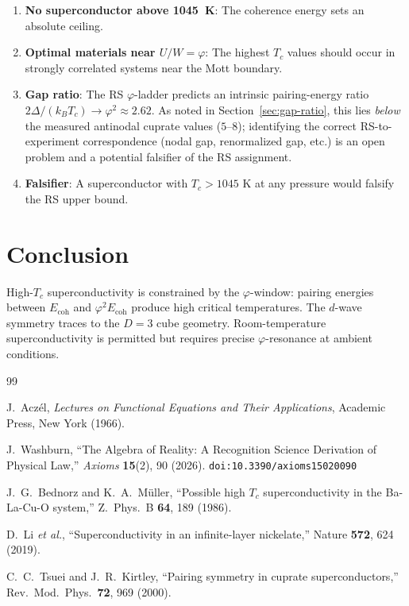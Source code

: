 \documentclass[12pt,a4paper]{article}
\theoremstyle{definition}
\theoremstyle{remark}
\begin{document}
\begin{enumerate}
  \item \textbf{No superconductor above 1045~K}: The coherence
  energy sets an absolute ceiling.

  \item \textbf{Optimal materials near $U/W = \varphi$}: The
  highest $T_c$ values should occur in strongly correlated
  systems near the Mott boundary.

  \item \textbf{Gap ratio}: The RS $\varphi$-ladder predicts an intrinsic
  pairing-energy ratio $2\Delta/(k_BT_c) \to \varphi^2 \approx 2.62$.
  As noted in Section~\ref{sec:gap-ratio}, this lies \emph{below} the
  measured antinodal cuprate values ($5$--$8$); identifying the correct
  RS-to-experiment correspondence (nodal gap, renormalized gap, etc.)
  is an open problem and a potential falsifier of the RS assignment.

  \item \textbf{Falsifier}: A superconductor with $T_c > 1045$ K
  at any pressure would falsify the RS upper bound.
\end{enumerate}

\section{Conclusion}
\label{sec:conclusion}

High-$T_c$ superconductivity is constrained by the $\varphi$-window:
pairing energies between $E_{\mathrm{coh}}$ and
$\varphi^2 E_{\mathrm{coh}}$ produce high critical temperatures.
The $d$-wave symmetry traces to the $D = 3$ cube geometry.
Room-temperature superconductivity is permitted but requires
precise $\varphi$-resonance at ambient conditions.

\begin{thebibliography}{99}

J.~Acz\'el, \emph{Lectures on Functional Equations and Their Applications},
Academic Press, New York (1966).

J.~Washburn, ``The Algebra of Reality: A Recognition Science Derivation
of Physical Law,'' \emph{Axioms} \textbf{15}(2), 90 (2026).
\texttt{doi:10.3390/axioms15020090}

J.~G.~Bednorz and K.~A.~M\"uller, ``Possible high $T_c$
superconductivity in the Ba-La-Cu-O system,'' Z.\ Phys.\ B
\textbf{64}, 189 (1986).

D.~Li \textit{et al.}, ``Superconductivity in an
infinite-layer nickelate,'' Nature \textbf{572}, 624 (2019).

C.~C.~Tsuei and J.~R.~Kirtley, ``Pairing symmetry in cuprate
superconductors,'' Rev.\ Mod.\ Phys.\ \textbf{72}, 969 (2000).

\end{thebibliography}
\end{document}
